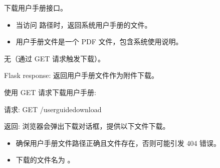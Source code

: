\documentclass[a4paper,12pt,english]{sphinxmanual}
\begin{document}

\begin{fulllineitems}
\label{\detokenize{api/login:login.DownloaUserGuide}}
\pysigstartsignatures
{}
\pysigstopsignatures
\sphinxAtStartPar
下载用户手册接口。
\begin{description}
\begin{itemize}
\item {} 
\sphinxAtStartPar
当访问  路径时，返回系统用户手册的文件。

\item {} 
\sphinxAtStartPar
用户手册文件是一个 PDF 文件，包含系统使用说明。

\end{itemize}

\sphinxAtStartPar
无（通过 GET 请求触发下载）。

\sphinxAtStartPar
Flask response: 返回用户手册文件作为附件下载。

\sphinxAtStartPar
使用 GET 请求下载用户手册:

\begin{sphinxVerbatim}[commandchars=\\\{\}]
请求:
GET /userguidedownload

返回:
浏览器会弹出下载对话框，提供以下文件下载。
\end{sphinxVerbatim}

\begin{itemize}
\item {} 
\sphinxAtStartPar
确保用户手册文件路径正确且文件存在，否则可能引发 404 错误。

\item {} 
\sphinxAtStartPar
下载的文件名为 。

\end{itemize}

\end{description}

\end{fulllineitems}

\end{document}

